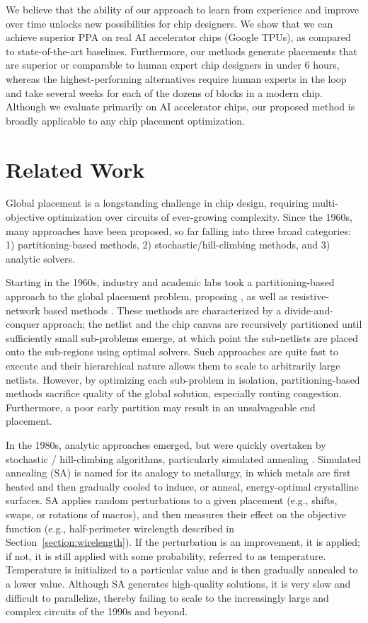 \documentclass{article}
\begin{document}
 We believe that the ability of our approach to learn from experience and improve over time unlocks new possibilities for chip designers. We show that we can achieve superior PPA on real AI accelerator chips (Google TPUs), as compared to state-of-the-art baselines. Furthermore, our methods generate placements that are superior or comparable to human expert chip designers in under 6 hours, whereas the highest-performing alternatives require human experts in the loop and take several weeks for each of the dozens of blocks in a modern chip. Although we evaluate primarily on AI accelerator chips, our proposed method is broadly applicable to any chip placement optimization. 
 
\section{Related Work}
\label{section:related_work}

Global placement is a longstanding challenge in chip design, requiring multi-objective optimization over circuits of ever-growing complexity. Since the 1960s, many approaches have been proposed, so far falling into three broad categories: 1) partitioning-based methods, 2) stochastic/hill-climbing methods, and 3) analytic solvers. 

Starting in the 1960s, industry and academic labs took a partitioning-based approach to the global placement problem, proposing \cite{MinCutBreuer1977,TerminalPropagation1985,fiduccia1982}, as well as resistive-network based methods \cite{ResistiveNetwork1984,proud1988}. These methods are characterized by a divide-and-conquer approach; the netlist and the chip canvas are recursively partitioned until sufficiently small sub-problems emerge, at which point the sub-netlists are placed onto the sub-regions using optimal solvers. Such approaches are quite fast to execute and their hierarchical nature allows them to scale to arbitrarily large netlists. However, by optimizing each sub-problem in isolation, partitioning-based methods sacrifice quality of the global solution, especially routing congestion. Furthermore, a poor early partition may result in an unsalvageable end placement.

In the 1980s, analytic approaches emerged, but were quickly overtaken by stochastic / hill-climbing algorithms, particularly simulated annealing \cite{SimulatedAnnealing,DAC-1986-SechenS,dragon}. Simulated annealing (SA) is named for its analogy to metallurgy, in which metals are first heated and then gradually cooled to induce, or anneal, energy-optimal crystalline surfaces. SA applies random perturbations to a given placement (e.g., shifts, swaps, or rotations of macros), and then measures their effect on the objective function (e.g., half-perimeter wirelength described in Section~\ref{section:wirelength}). If the perturbation is an improvement, it is applied; if not, it is still applied with some probability, referred to as temperature. Temperature is initialized to a particular value and is then gradually annealed to a lower value. Although SA generates high-quality solutions, it is very slow and difficult to parallelize, thereby failing to scale to the increasingly large and complex circuits of the 1990s and beyond.
\end{document}
